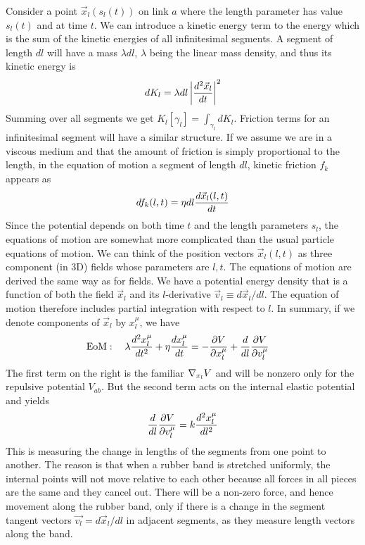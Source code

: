 \documentclass[nofootinbib,preprint,floatfix,titlepage,superscriptaddress]{revtex4} %
\begin{document}
Consider a point $\vec{x}_l(s_l(t))$ on link $a$ where the length parameter has value $s_l(t)$ and at time $t$. We can introduce a kinetic energy term to the energy which is the sum of the kinetic energies of all infinitesimal segments.
A segment of length $dl$ will have a mass $\lambda dl $, $\lambda$ being the linear mass density, and thus its kinetic energy is
\[dK_l = \lambda dl \left|d^2 \vec{x}_l \over dt \right|^2\]
Summing over all segments we get $K_l[\gamma_l] = \int_{\gamma_l} dK_l$. Friction terms for an infinitesimal segment will have a similar structure. If we assume we are in a viscous medium and that the amount of friction is simply proportional to the length, in the equation of motion a segment of length $dl$, kinetic friction $f_k$ appears as 
\[df_k(l,t) =\eta dl {d\vec{x}_l(l,t)\over dt}\] 
Since the potential depends on both time $t$ and the length parameters $s_l$, the equations of motion are somewhat more complicated than the usual particle equations of motion. We can think of the position vectors $\vec{x}_l (l,t)$ as three component (in 3D) fields whose parameters are $l,t$. The equations of motion are derived the same way as for fields. We have a potential energy density that is a function of both the field $\vec{x}_l$ and its $l$-derivative $\vec{v}_l \equiv d\vec{x}_l/dl$. The equation of motion therefore includes partial integration with respect to $l$. In summary, if we denote components of $\vec{x}_l$ by $x_l^\mu$, we have 
\begin{align}
    \mbox{EoM}:\quad \lambda {d^2 x_l^\mu \over dt^2} +\eta {dx_l^\mu \over dt} & =  -{\partial V \over \partial x_l^\mu} + {d\over dl} {\partial V \over \partial v_l^\mu}   \label{eq:Langevin}
\end{align}
The first term on the right is the familiar $\nabla_{x_l} V$ and will be nonzero only for the repulsive potential $V_{ab}$. But the second term acts on the internal elastic potential and yields \[{d\over dl} {\partial V \over \partial v_l^\mu} = k {d^2 x_l^\mu \over dl^2}\]  
This is measuring the change in lengths of the segments from one point to another. The reason is that when a rubber band is stretched uniformly, the internal points will not move relative to each other because all forces in all pieces are the same and they cancel out. There will be a non-zero force, and hence movement along the rubber band, only if there is a change in the segment tangent vectors $\vec{v_l} = d\vec{x}_l/dl$ in adjacent segments, as they measure length vectors along the band.
\end{document}
